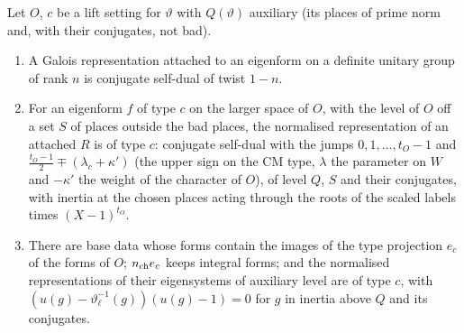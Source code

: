 \begin{theorem}\label{thm:attached}
Let $O$, $c$ be a lift setting for $\vartheta$ with $Q(\vartheta)$ auxiliary (its places of prime norm and, with their conjugates, not bad).
\begin{enumerate}[label=\textup{(\alph*)}]
\item A Galois representation attached to an eigenform on a definite unitary group of rank $n$ is conjugate self-dual of twist $1-n$.
\item For an eigenform $f$ of type $c$ on the larger space of $O$, with the level of $O$ off a set $S$ of places outside the bad places, the normalised representation of an attached $R$ is of type $c$: conjugate
self-dual with the jumps $0,1,\dots,t_O-1$ and $\frac{t_O-1}2\mp(\lambda_c+\kappa')$ (the upper sign on the CM type, $\lambda$ the parameter on $W$ and $-\kappa'$ the weight of the character of $O$), of level $Q$, $S$
and their conjugates, with inertia at the chosen places acting through the roots of the scaled labels times $(X-1)^{t_O}$.
\item There are base data whose forms contain the images of the type projection $e_c$ of the forms of $O$; $n_{\rm ch}e_c$ keeps integral forms; and the normalised representations of their eigensystems
of auxiliary level are of type $c$, with $(u(g)-\vartheta_\ell^{-1}(g))(u(g)-1)=0$ for $g$ in inertia above $Q$ and its conjugates.
\end{enumerate}
\end{theorem}

